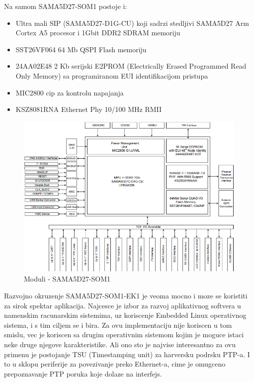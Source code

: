 \documentclass[a4paper,12pt, master]{etf}
\begin{document}
	Na samom SAMA5D27-SOM1 postoje i:
	\begin{itemize}
		\item Ultra mali SIP (SAMA5D27-D1G-CU) koji sadrzi stedljivi SAMA5D27 Arm Cortex A5
		procesor i 1Gbit DDR2 SDRAM memoriju
		\item SST26VF064 64 Mb QSPI Flash memoriju
		\item 24AA02E48 2 Kb serijski E2PROM (Electrically Erased Programmed Read Only Memory) 
		sa programiranom EUI identifikacijom pristupa
		\item MIC2800 cip za kontrolu napajanja
		\item KSZ8081RNA Ethernet Phy 10/100 MHz RMII
	\end{itemize}

	\begin{figure}[htb]
		\centering
		\includegraphics[scale=.7]{../pic/hw_som_modules.PNG}
		\caption{Moduli - SAMA5D27-SOM1}
		\label{fig:hw_som_modules}
	\end{figure}

	Razvojno okruzenje SAMA5D27-SOM1-EK1 je veoma mocno i moze se koristiti za sirok spektar
	aplikacija. Najcesce je izbor za razvoj aplikativnog softvera u namenskim racunarskim
	sistemima, uz koriscenje Embedded Linux operativnog sistema, i s tim ciljem se i bira. Za 
	ovu	implementaciju nije koriscen u tom smislu, vec je koriscen sa drugim operativnim 
	sistemom kojim je moguce istaci neke druge njegove karakteristike. Ali ono sto je najvise 
	interesantno za ovu	primenu je postojanje TSU (Timestamping unit) za harversku podrsku 
	PTP-a. I to u sklopu periferije za povezivanje preko Ethernet-a, cime je omugceno 
	prepoznavanje PTP poruka koje dolaze na interfejs.
\end{document}
